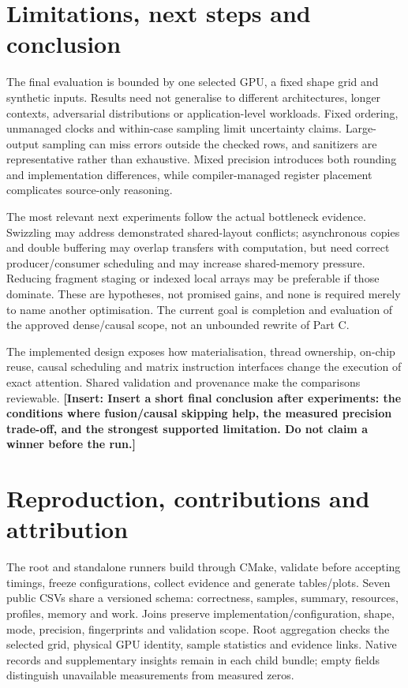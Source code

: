 \documentclass[11pt,a4paper]{article}
\newcommand{\pending}[1]{\textcolor{draftblue}{\textbf{[Insert: #1]}}}
\begin{document}
\section{Limitations, next steps and conclusion}\label{sec:limits}
The final evaluation is bounded by one selected GPU, a fixed shape grid and
synthetic inputs. Results need not generalise to different architectures,
longer contexts, adversarial distributions or application-level workloads.
Fixed ordering, unmanaged clocks and within-case sampling limit uncertainty
claims. Large-output sampling can miss errors outside the checked rows, and
sanitizers are representative rather than exhaustive. Mixed precision introduces
both rounding and implementation differences, while compiler-managed register
placement complicates source-only reasoning.

The most relevant next experiments follow the actual bottleneck evidence.
Swizzling may address demonstrated shared-layout conflicts; asynchronous copies
and double buffering may overlap transfers with computation, but need correct
producer/consumer scheduling and may increase shared-memory pressure. Reducing
fragment staging or indexed local arrays may be preferable if those dominate.
These are hypotheses, not promised gains, and none is required merely to name
another optimisation. The current goal is completion and evaluation of the
approved dense/causal scope, not an unbounded rewrite of Part C.

The implemented design exposes how materialisation, thread ownership, on-chip
reuse, causal scheduling and matrix instruction interfaces change the execution
of exact attention. Shared validation and provenance make the comparisons
reviewable. \pending{Insert a short final conclusion after experiments: the
conditions where fusion/causal skipping help, the measured precision trade-off,
and the strongest supported limitation. Do not claim a winner before the run.}

\section{Reproduction, contributions and attribution}\label{sec:reproducibility}
The root and standalone runners build through CMake, validate before accepting
timings, freeze configurations, collect evidence and generate tables/plots.
Seven public CSVs share a versioned schema: correctness, samples, summary,
resources, profiles, memory and work. Joins preserve implementation/configuration,
shape, mode, precision, fingerprints and validation scope. Root aggregation
checks the selected grid, physical GPU identity, sample statistics and evidence
links. Native records and supplementary insights remain in each child bundle;
empty fields distinguish unavailable measurements from measured zeros.
\end{document}
